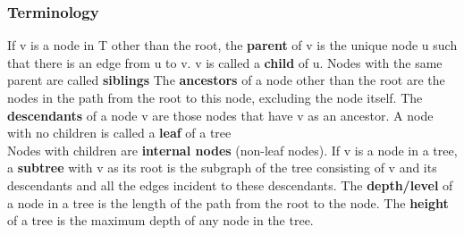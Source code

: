 \documentclass[12pt, letterpaper]{article}
\begin{document}
\pagebreak

\subsubsection{Terminology}

\begin{minipage}[t]{0.65\linewidth}
	If v is a node in T other than the root, the \textbf{parent} of v is the unique node u such that there is an edge from u to v. v is called a \textbf{child} of u. Nodes with the same parent are called \textbf{siblings} \bigbreak
	The \textbf{ancestors} of a node other than the root are the nodes in the path from the root to this node, excluding the node itself. The \textbf{descendants} of a node v are those nodes that have v as an ancestor. \bigbreak
	A node with no children is called a \textbf{leaf} of a tree \\ Nodes with children are \textbf{internal nodes} (non-leaf nodes). \bigbreak
	If v is a node in a tree, a \textbf{subtree} with v as its root is the subgraph of the tree consisting of v and its descendants and all the edges incident to these descendants. \bigbreak
	The \textbf{depth/level} of a node in a tree is the length of the path from the root to the node. 
	The \textbf{height} of a tree is the maximum depth of any node in the tree.
\end{minipage}
\end{document}
